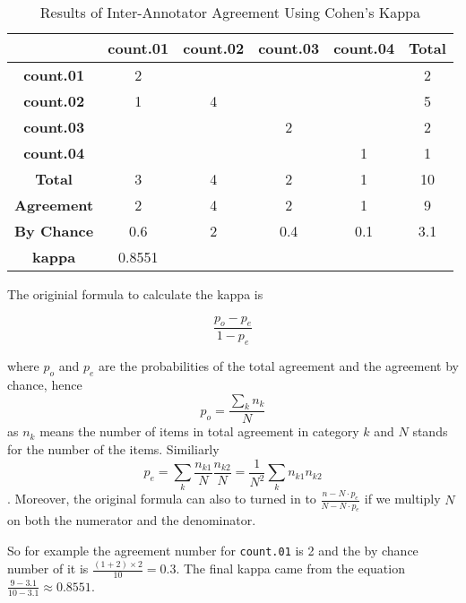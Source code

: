 \documentclass[11pt]{article} %
\begin{document}
\begin{table}[h]
    \begin{center}
        \caption{Results of Inter-Annotator Agreement Using Cohen's Kappa}
        \label{tab:table2}
        \begin{tabular}{c|c|c|c|c|c}
            \textbf{} & \textbf{count.01} & \textbf{count.02} & \textbf{count.03} & \textbf{count.04} & \textbf{Total}\\
            \hline
            \textbf{count.01} & 2 & & & & 2\\
            \hline
            \textbf{count.02} & 1 & 4 & & & 5\\
            \hline
            \textbf{count.03} & & & 2 & & 2\\
            \hline
            \textbf{count.04} & & & & 1 & 1\\
            \hline
            \textbf{Total} & 3 & 4 & 2 & 1 & 10\\
            \hline
            \hline
            \textbf{Agreement} & 2 & 4 & 2 & 1 & 9\\
            \hline
            \textbf{By Chance} & 0.6 & 2 & 0.4 & 0.1 & 3.1\\
            \hline
            \hline
            \textbf{kappa} & 0.8551\\
        \end{tabular}
    \end{center}
\end{table}

The originial formula to calculate the kappa is 

\begin{equation}
    \frac{p_o-p_e}{1-p_e}
\end{equation}

where $p_o$ and $p_e$ are the probabilities of the total agreement and the agreement by chance, hence $$p_o=\frac{\sum_kn_{k}}{N}$$ as $n_{k}$ means the number of items in total agreement in category $k$ and $N$ stands for the number of the items. Similiarly $$p_e=\sum_k\frac{n_{k1}}{N}\frac{n_{k2}}{N}=\frac{1}{N^2}\sum_kn_{k1}n_{k2}$$. Moreover, the original formula can also to turned in to $\frac{n-N\cdot p_e}{N-N\cdot p_e}$ if we multiply $N$ on both the numerator and the denominator.

So for example the agreement number for \texttt{count.01} is 2 and the by chance number of it is $\frac{(1+2)\times2}{10}=0.3$. The final kappa came from the equation $\frac{9-3.1}{10-3.1}\approx0.8551$.
\end{document}
